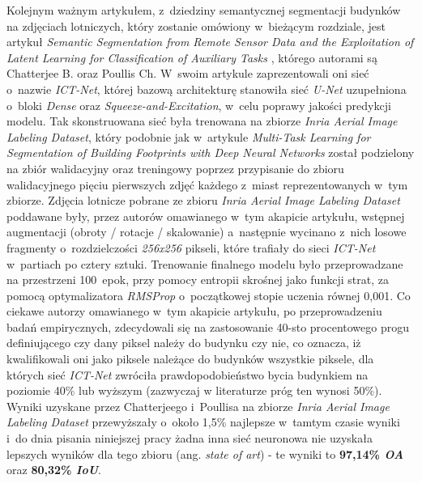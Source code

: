 Kolejnym ważnym artykułem, z~dziedziny semantycznej segmentacji budynków na zdjęciach lotniczych, który zostanie omówiony w~bieżącym rozdziale, jest artykuł \emph{Semantic Segmentation from Remote Sensor Data and the Exploitation of Latent Learning for Classification of Auxiliary Tasks} \cite{chatterjee}, którego autorami są Chatterjee B. oraz Poullis Ch. W~swoim artykule zaprezentowali oni sieć o~nazwie \emph{ICT-Net}, której bazową architekturę stanowiła sieć \emph{U-Net} uzupełniona o~bloki \emph{Dense} oraz \emph{Squeeze-and-Excitation}, w~celu poprawy jakości predykcji modelu. Tak skonstruowana sieć była trenowana na zbiorze \emph{Inria Aerial Image Labeling Dataset}, który podobnie jak w~artykule \emph{Multi-Task Learning for Segmentation of Building Footprints with Deep Neural Networks} został podzielony na zbiór walidacyjny oraz treningowy poprzez przypisanie do zbioru walidacyjnego pięciu pierwszych zdjęć każdego z~miast reprezentowanych w~tym zbiorze. Zdjęcia lotnicze pobrane ze zbioru \emph{Inria Aerial Image Labeling Dataset} poddawane były, przez autorów omawianego w~tym akapicie artykułu, wstępnej augmentacji (obroty / rotacje / skalowanie) a~następnie wycinano z~nich losowe fragmenty o~rozdzielczości \emph{256x256} pikseli, które trafiały do sieci \emph{ICT-Net} w~partiach po cztery sztuki. Trenowanie finalnego modelu było przeprowadzane na przestrzeni 100~epok, przy pomocy entropii skrośnej jako funkcji strat, za pomocą optymalizatora \emph{RMSProp} o~początkowej stopie uczenia równej 0,001. Co ciekawe autorzy omawianego w~tym akapicie artykułu, po przeprowadzeniu badań empirycznych, zdecydowali się na zastosowanie 40-sto procentowego progu definiującego czy dany piksel należy do budynku czy nie, co oznacza, iż kwalifikowali oni jako piksele należące do budynków wszystkie piksele, dla których sieć \emph{ICT-Net} zwróciła prawdopodobieństwo bycia budynkiem na poziomie 40\% lub wyższym (zazwyczaj w literaturze próg ten wynosi 50\%). Wyniki uzyskane przez Chatterjeego i~Poullisa na zbiorze \emph{Inria Aerial Image Labeling Dataset} przewyższały o~około 1,5\% najlepsze w~tamtym czasie wyniki i~do dnia pisania niniejszej pracy żadna inna sieć neuronowa nie uzyskała lepszych wyników dla tego zbioru (ang. \emph{state of art}) - te wyniki to \textbf{97,14\% \emph{OA}} oraz \textbf{80,32\% \emph{IoU}}.

